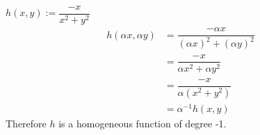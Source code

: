 $h(x,y) := \dfrac{-x}{x^2+y^2}$
\begin{align*}
    h(\alpha x,\alpha y) &= \dfrac{-\alpha x}{(\alpha x)^2+(\alpha y)^2} \\
    &= \dfrac{-x}{\alpha x^2+\alpha y^2} \\
    &= \dfrac{-x}{\alpha (x^2 + y^2)}  \\
    &= \alpha^{-1} h(x,y)
\end{align*}
Therefore $h$ is a homogeneous function of degree -1.